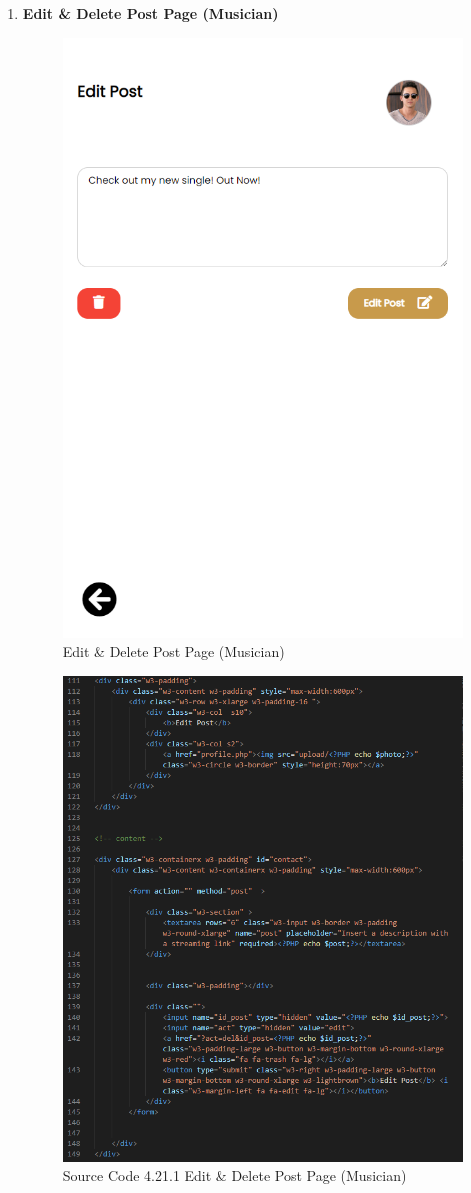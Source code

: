 \begin{enumerate}[1.]
    \item \textbf{Edit \& Delete Post Page (Musician)}
    \begin{figure}[h]
        \centering
        \includegraphics[width=0.5\linewidth]{mainmatter/images/frontend/ss/Edit-Delete Post (Musician).png}
        \caption{Edit \& Delete Post Page (Musician)}
        \label{fig:myfig60}
    \end{figure}
    \begin{figure}[h]
        \centering
        \includegraphics[width=0.7\linewidth]{mainmatter/images/frontend/code/meditpost.png}
        \caption*{Source Code 4.21.1 Edit \& Delete Post Page (Musician)}
        \label{fig:myfig60a}
    \end{figure}


\end{enumerate}
